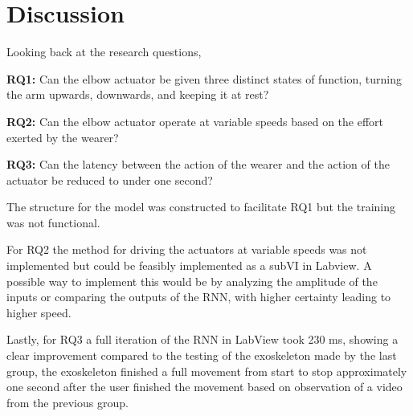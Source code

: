 \section{Discussion}
\label{section:disc}

Looking back at the research questions,

\item \textbf{RQ1:} Can the elbow actuator be given three distinct states of function, turning the arm upwards, downwards, and keeping it at rest?

    \item \textbf{RQ2:} Can the elbow actuator operate at variable speeds based on the effort exerted by the wearer?

    \item \textbf{RQ3:} Can the latency between the action of the wearer and the action of the actuator be reduced to under one second?

The structure for the model was constructed to facilitate RQ1 but the training was not functional.

For RQ2 the method for driving the actuators at variable speeds was not implemented but could be feasibly implemented as a subVI in Labview. 
A possible way to implement this would be by analyzing the amplitude of the inputs or comparing the outputs of the RNN, with higher certainty leading to higher speed.

Lastly, for RQ3 a full iteration of the RNN in LabView took 230 ms, showing a clear improvement compared to the testing of the exoskeleton 
made by the last group, the exoskeleton finished a full movement from start to stop approximately one second after the user finished the 
movement based on observation of a video from the previous group.
